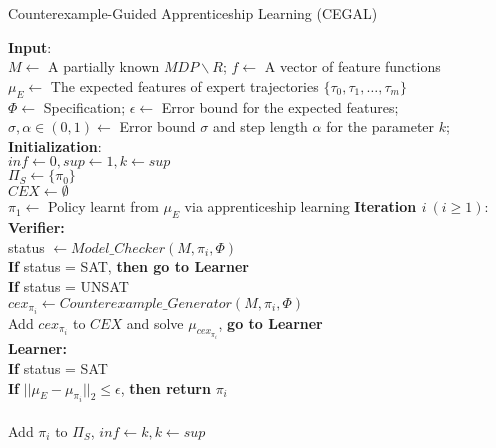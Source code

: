 \begin{algorithm}[htb]
\caption{Counterexample-Guided Apprenticeship Learning (CEGAL)}
\begin{algorithmic}[1]
\State \textbf{Input}:
\\\qquad $M\gets$ A partially known $MDP\backslash R$; $f\gets$ A vector of feature functions
\\\qquad $\mu_E\gets$ The expected features of expert trajectories $\{\tau_0, \tau_1, \ldots,\tau_m\}$
\\\qquad $\Phi\gets$ Specification; $\epsilon\gets$ Error bound for the expected features;
\\\qquad $\sigma, \alpha\in(0, 1)\gets$ Error bound $\sigma$ and step length $\alpha$ for the parameter $k$; 
\State \textbf{Initialization}:
\\\qquad $inf\leftarrow0, sup\leftarrow1, k\leftarrow sup$ 
\\\qquad $\Pi_S\leftarrow\{\pi_0\}$ 
\\\qquad $CEX\leftarrow\emptyset$ 
\\\qquad $\pi_1\leftarrow$ Policy learnt from $\mu_E$ via apprenticeship learning
\State \textbf{Iteration $i\ (i\geq 1)$}:
\\\qquad\textbf{Verifier:}
\\\qquad\qquad status $\gets Model\_Checker(M,\pi_i, \Phi)$
\\\qquad\qquad \textbf{If} status = SAT, \textbf{then go to Learner}
\\\qquad\qquad \textbf{If} status = UNSAT
\\\qquad\qquad\qquad $cex_{\pi_i}\gets Counterexample\_Generator(M,\pi_i,\Phi)$
\\\qquad\qquad\qquad Add $cex_{\pi_i}$ to $CEX$ and solve $\mu_{cex_{\pi_i}}$, \textbf{go to Learner} 
\\\qquad\textbf{Learner:}
\\\qquad\qquad \textbf{If} status = SAT
\\\qquad\qquad\qquad \textbf{If} $||\mu_E-\mu_{\pi_i}||_2\leq \epsilon$, {\bf then return} $\pi_i$
\\
\\\qquad\qquad\qquad Add $\pi_i$ to $\Pi_S$, $inf \leftarrow k, k \leftarrow sup$

\end{algorithmic}
\end{algorithm}
